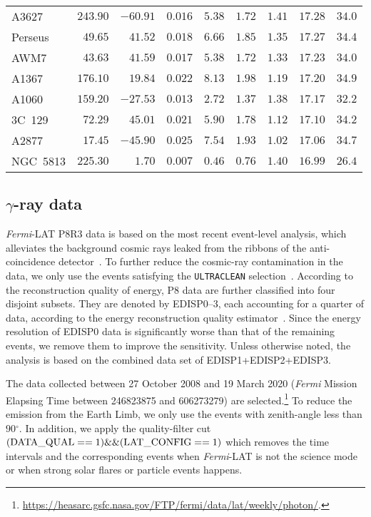 \documentclass[
	twocolumn,
]{aastex6} %
\newcommand{\fermi}{\emph{Fermi}\xspace}
\newcommand{\lat}{\emph{Fermi}-LAT\xspace}
\renewcommand{\deg}{\ensuremath{^{\circ}}\xspace}
\begin{document}
\begin{table*}
\begin{tabular}{lrrcccccc}
		A3627    &$ 243.90 $&$-60.91 $&$0.016$&$ 5.38 $&$ 1.72 $&$ 1.41 $&$ 17.28 $&$ 34.0 $\\
		Perseus  &$  49.65 $&$ 41.52 $&$0.018$&$ 6.66 $&$ 1.85 $&$ 1.35 $&$ 17.27 $&$ 34.4 $\\
		AWM7     &$  43.63 $&$ 41.59 $&$0.017$&$ 5.38 $&$ 1.72 $&$ 1.33 $&$ 17.23 $&$ 34.0 $\\
		A1367    &$ 176.10 $&$ 19.84 $&$0.022$&$ 8.13 $&$ 1.98 $&$ 1.19 $&$ 17.20 $&$ 34.9 $\\
		A1060    &$ 159.20 $&$-27.53 $&$0.013$&$ 2.72 $&$ 1.37 $&$ 1.38 $&$ 17.17 $&$ 32.2 $\\
		3C~129   &$  72.29 $&$ 45.01 $&$0.021$&$ 5.90 $&$ 1.78 $&$ 1.12 $&$ 17.10 $&$ 34.2 $\\
		A2877    &$  17.45 $&$-45.90 $&$0.025$&$ 7.54 $&$ 1.93 $&$ 1.02 $&$ 17.06 $&$ 34.7 $\\
		NGC~5813 &$ 225.30 $&$  1.70 $&$0.007$&$ 0.46 $&$ 0.76 $&$ 1.40 $&$ 16.99 $&$ 26.4 $\\
		\hline\hline
	\end{tabular}
\end{table*}

\subsection{$\gamma$-ray data}
\lat P8R3 data is based on the most recent event-level analysis, which alleviates the background cosmic rays leaked from the ribbons of the anti-coincidence detector~\citep{Bruel2018}.
To further reduce the cosmic-ray contamination in the data, we only use the events satisfying the {\tt ULTRACLEAN} selection~\citep{Ackermann2012_CKWEC}.
According to the reconstruction quality of energy, P8 data are further classified into four disjoint subsets.
They are denoted by EDISP0--3, each accounting for a quarter of data, according to the energy reconstruction quality estimator~\citep{Atwood2013_C82D0}.
Since the energy resolution of EDISP0 data is significantly worse than that of the remaining events, we remove them to improve the sensitivity.
Unless otherwise noted, the analysis is based on the combined data set of EDISP1+EDISP2+EDISP3.

The data collected between 27 October 2008 and 19 March 2020 (\fermi Mission Elapsing Time between 246823875 and 606273279) are selected.\footnote{\url{https://heasarc.gsfc.nasa.gov/FTP/fermi/data/lat/weekly/photon/}.}
To reduce the emission from the Earth Limb, we only use the events with zenith-angle less than $90\deg$.
In addition, we apply the quality-filter cut $\rm (DATA\_QUAL==1)\&\&(LAT\_CONFIG==1)$ which removes the time intervals and the corresponding events when \lat is not the science mode or when strong solar flares or particle events happens.
\end{document}
